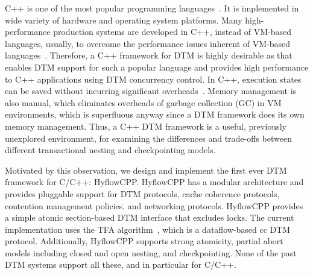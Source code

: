 \documentclass[12pt,english]{report}
\begin{document}
C++ is one of the most popular programming languages~\cite{langpop}. It is implemented in wide variety of hardware and operating system platforms. Many high-performance production systems are developed in C++, instead of VM-based languages, usually, to overcome the performance issues inherent of VM-based languages~\cite{hundt2011loop}. Therefore, a C++ framework for DTM is highly desirable as that enables DTM support for such a popular language and provides high performance to C++ applications using DTM concurrency control. In C++, execution states can be saved without incurring significant overheads~\cite{continuation:wiki}. Memory management is also manual, which eliminates overheads of garbage collection (GC) in VM environments, which is superfluous anyway since a DTM framework does its own memory management. Thus, a C++ DTM framework is a useful, previously unexplored environment, for examining the differences and trade-offs between different transactional nesting and checkpointing models.

Motivated by this observation, we design and implement the first ever DTM framework for C/C++: HyflowCPP. HyflowCPP has a modular architecture and provides pluggable support for DTM protocols, cache coherence protocols, contention management policies, and networking protocols. HyflowCPP provides a simple atomic section-based DTM interface that excludes locks. The current implementation uses the TFA algorithm~\cite{saad2011transactional}, which is a dataflow-based cc DTM protocol. 
Additionally, HyflowCPP supports strong atomicity, partial abort models including closed and open nesting, and checkpointing. None of the past DTM systems support all these, and in particular for C/C++. 
\end{document}
